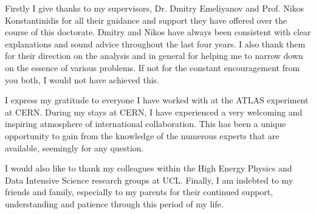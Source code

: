 Firstly I give thanks to my supervisors, Dr. Dmitry Emeliyanov and Prof. Nikos Konstantinidis for all their guidance and support they have offered over the course of this doctorate. Dmitry and Nikos have always been consistent with clear explanations and sound advice throughout the last four years. I also thank them for their direction on the analysis and in general for helping me to narrow down on the essence of various problems. If not for the constant encouragement from you both, I would not have achieved this. 

I express my gratitude to everyone I have worked with at the ATLAS experiment at CERN. During my stays at CERN, I have experienced a very welcoming and inspiring atmosphere of international collaboration. This has been a unique opportunity to gain from the knowledge of the numerous experts that are available, seemingly for any question.

I would also like to thank my colleagues within the High Energy Physics and Data Intensive Science research groups at UCL. Finally, I am indebted to my friends and family, especially to my parents for their continued support, understanding and patience through this period of my life.
